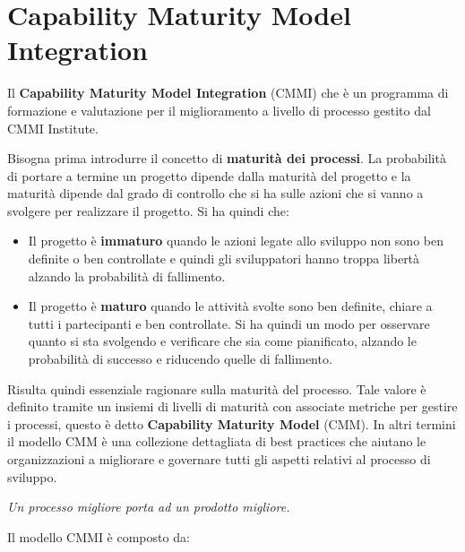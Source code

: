\chapter{Capability Maturity Model Integration}
Il \textbf{Capability Maturity Model Integration} (CMMI) che è un programma di
formazione e valutazione per il miglioramento a livello di processo gestito dal
CMMI Institute.

Bisogna prima introdurre il concetto di \textbf{maturità dei processi}. La
probabilità di portare a termine un progetto dipende dalla maturità del progetto
e la maturità dipende dal grado di controllo che si ha sulle azioni che si vanno
a svolgere per realizzare il progetto. Si ha quindi che:
\begin{itemize}
      \item Il progetto è \textbf{immaturo} quando le azioni legate allo sviluppo non sono
            ben definite o ben controllate e quindi gli sviluppatori hanno troppa
            libertà alzando la probabilità di fallimento.
      \item Il progetto è \textbf{maturo} quando le attività svolte sono ben definite,
            chiare a tutti i partecipanti e ben controllate. Si ha quindi un modo
            per osservare quanto si sta svolgendo e verificare che sia come
            pianificato, alzando le probabilità di successo e riducendo quelle di
            fallimento.
\end{itemize}
Risulta quindi essenziale ragionare sulla maturità del processo. Tale valore è
definito tramite un insiemi di livelli di maturità con associate metriche per
gestire i processi, questo è detto \textbf{Capability Maturity Model} (CMM). In
altri termini il modello CMM è una collezione dettagliata di best practices che
aiutano le organizzazioni a migliorare e governare tutti gli aspetti relativi al
processo di sviluppo.
\begin{center}
      \textit{Un processo migliore porta ad un prodotto migliore.}
\end{center}
Il modello CMMI è composto da:
